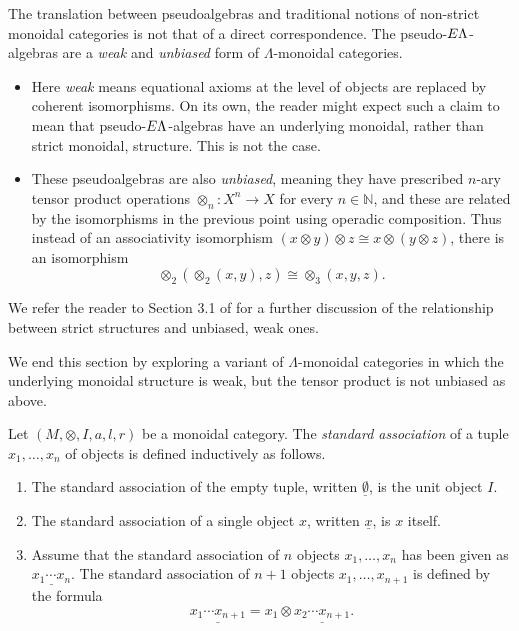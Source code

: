 \begin{rem}\label{rem:ps-P-alg-unpack}
The translation between pseudoalgebras and traditional notions of non-strict monoidal categories is not that of a direct correspondence. The pseudo-$E\Lambda$-algebras are a \emph{weak} and \emph{unbiased} form of $\Lambda$-monoidal categories.
\begin{itemize}
\item Here \emph{weak} means equational axioms at the level of objects are replaced by coherent isomorphisms. On its own, the reader might expect such a claim to mean that pseudo-$E\Lambda$-algebras have an underlying monoidal, rather than strict monoidal, structure. This is not the case.
\item These pseudoalgebras are also \emph{unbiased}, meaning they have prescribed $n$-ary tensor product operations $\otimes_n \colon X^n \to X$ for every $n \in \mathbb{N}$, and these are related by the isomorphisms in the previous point using operadic composition. Thus instead of an associativity isomorphism $(x \otimes y) \otimes z \cong x \otimes (y \otimes z)$, there is an isomorphism
\[
\otimes_2\left( \otimes_2(x,y), z\right) \cong \otimes_3(x,y,z).
\]
\end{itemize}
We refer the reader to Section 3.1 of \cite{leinster} for a further discussion of the relationship between strict structures and unbiased, weak ones.
\end{rem}

We end this section by exploring a variant of $\Lambda$-monoidal categories in which the underlying monoidal structure is weak, but the tensor product is not unbiased as above.

\begin{nota}\label{nota:standard-assoc}
Let $(M, \otimes, I, a, l, r)$ be a monoidal category. The \emph{standard association} of a tuple $x_1, \ldots, x_n$ of objects is defined inductively as follows.
\begin{enumerate}
\item The standard association of the empty tuple, written $\underline{\emptyset}$, is the unit object $I$.
\item The standard association of a single object $x$, written $\underline{x}$, is $x$ itself.
\item Assume that the standard association of $n$ objects $x_1, \ldots, x_n$ has been given as $\underline{x_1 \cdots x_n}$. The standard association of $n+1$ objects $x_1, \ldots, x_{n+1}$ is defined by the formula
\[
\underline{x_1 \cdots x_{n+1}} = x_1 \otimes \underline{x_2 \cdots x_{n+1}}.
\]
\end{enumerate}
\end{nota}


